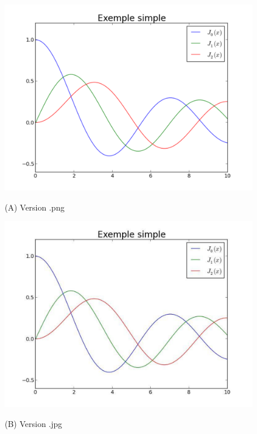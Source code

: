 \medskip
\begin{figure}[htb]
\begin{minipage}[b]{0.33\linewidth}
  \centering
 \centerline{\includegraphics[width=1.\textwidth]{example_simple_png}}
  \vspace{0.1cm}
  \centerline{(A) Version .png}\medskip
\end{minipage}
\hfill
\begin{minipage}[b]{.33\linewidth}
  \centering
 \centerline{\includegraphics[width=1.\textwidth]{example_simple_jpg}}
  \vspace{0.1cm}
  \centerline{(B) Version .jpg}\medskip
\end{minipage}%
\hfill
\begin{minipage}[b]{.33\linewidth}

\end{minipage}
\end{figure}
